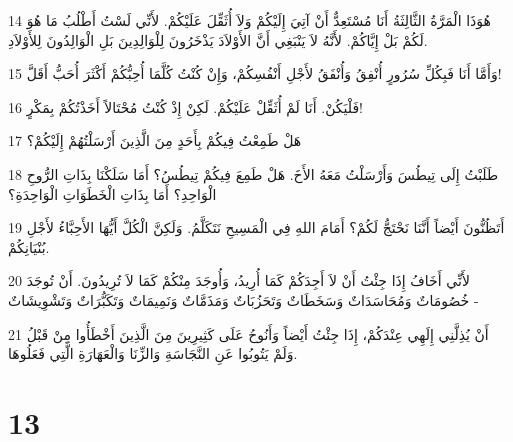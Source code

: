 \par 14 هُوَذَا الْمَرَّةُ الثَّالِثَةُ أَنَا مُسْتَعِدٌّ أَنْ آتِيَ إِلَيْكُمْ وَلاَ أُثَقِّلَ عَلَيْكُمْ. لأَنِّي لَسْتُ أَطْلُبُ مَا هُوَ لَكُمْ بَلْ إِيَّاكُمْ. لأَنَّهُ لاَ يَنْبَغِي أَنَّ الأَوْلاَدَ يَذْخَرُونَ لِلْوَالِدِينَ بَلِ الْوَالِدُونَ لِلأَوْلاَدِ.
\par 15 وَأَمَّا أَنَا فَبِكُلِّ سُرُورٍ أُنْفِقُ وَأُنْفَقُ لأَجْلِ أَنْفُسِكُمْ، وَإِنْ كُنْتُ كُلَّمَا أُحِبُّكُمْ أَكْثَرَ أُحَبُّ أَقَلَّ!
\par 16 فَلْيَكُنْ. أَنَا لَمْ أُثَقِّلْ عَلَيْكُمْ. لَكِنْ إِذْ كُنْتُ مُحْتَالاً أَخَذْتُكُمْ بِمَكْرٍ!
\par 17 هَلْ طَمِعْتُ فِيكُمْ بِأَحَدٍ مِنَ الَّذِينَ أَرْسَلْتُهُمْ إِلَيْكُمْ؟
\par 18 طَلَبْتُ إِلَى تِيطُسَ وَأَرْسَلْتُ مَعَهُ الأَخَ. هَلْ طَمِعَ فِيكُمْ تِيطُسُ؟ أَمَا سَلَكْنَا بِذَاتِ الرُّوحِ الْوَاحِدِ؟ أَمَا بِذَاتِ الْخَطَوَاتِ الْوَاحِدَةِ؟
\par 19 أَتَظُنُّونَ أَيْضاً أَنَّنَا نَحْتَجُّ لَكُمْ؟ أَمَامَ اللهِ فِي الْمَسِيحِ نَتَكَلَّمُ. وَلَكِنَّ الْكُلَّ أَيُّهَا الأَحِبَّاءُ لأَجْلِ بُنْيَانِكُمْ.
\par 20 لأَنِّي أَخَافُ إِذَا جِئْتُ أَنْ لاَ أَجِدَكُمْ كَمَا أُرِيدُ، وَأُوجَدَ مِنْكُمْ كَمَا لاَ تُرِيدُونَ. أَنْ تُوجَدَ خُصُومَاتٌ وَمُحَاسَدَاتٌ وَسَخَطَاتٌ وَتَحَزُبَاتٌ وَمَذَمَّاتٌ وَنَمِيمَاتٌ وَتَكَبُّرَاتٌ وَتَشْوِيشَاتٌ -
\par 21 أَنْ يُذِلَّنِي إِلَهِي عِنْدَكُمْ، إِذَا جِئْتُ أَيْضاً وَأَنُوحُ عَلَى كَثِيرِينَ مِنَ الَّذِينَ أَخْطَأُوا مِنْ قَبْلُ وَلَمْ يَتُوبُوا عَنِ النَّجَاسَةِ وَالزِّنَا وَالْعَهَارَةِ الَّتِي فَعَلُوهَا.

\chapter{13}

